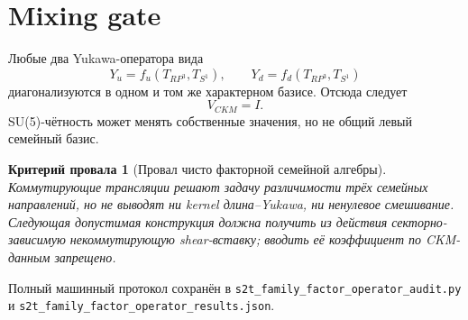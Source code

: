 \documentclass[12pt,a4paper]{article}
\newtheorem{nogocriterion}{Критерий провала}
\begin{document}
\section{Mixing gate}

Любые два Yukawa-оператора вида
\begin{equation}
 Y_u=f_u(T_{RP^3},T_{S^1}),
 \qquad
 Y_d=f_d(T_{RP^3},T_{S^1})
\end{equation}
диагонализуются в одном и том же характерном базисе. Отсюда следует
\begin{equation}
 V_{CKM}=I.
\end{equation}
SU(5)-чётность может менять собственные значения, но не общий левый семейный
базис.

\begin{nogocriterion}[Провал чисто факторной семейной алгебры]
Коммутирующие трансляции решают задачу различимости трёх семейных направлений,
но не выводят ни kernel длина--Yukawa, ни ненулевое смешивание. Следующая
допустимая конструкция должна получить из действия секторно-зависимую
некоммутирующую shear-вставку; вводить её коэффициент по CKM-данным запрещено.
\end{nogocriterion}

Полный машинный протокол сохранён в
\texttt{s2t\_family\_factor\_operator\_audit.py} и
\texttt{s2t\_family\_factor\_operator\_results.json}.
\end{document}
